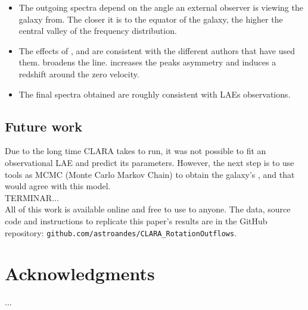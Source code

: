 \documentclass[twocolappendix]{latex/emulateapj}
\begin{document}
\begin{itemize}
	\item The outgoing spectra depend on the angle an external observer is viewing the galaxy from. The closer it is to the equator of the galaxy, the higher the central valley of the frequency distribution. \\
	
	\item The effects of \vrot, \vout and \tauh are consistent with the different authors that have used them. \vrot broadens the \lya line. \vout increases the peaks asymmetry and \tauh induces a redshift around the zero velocity.\\
	
	\item The final spectra obtained are roughly consistent with LAEs observations.  \\
	
\end{itemize}

\subsection{Future work}



Due to the long time CLARA takes to run, it was not possible to fit an observational LAE and predict its parameters. However, the next step is to use tools as MCMC (Monte Carlo Markov Chain) to obtain the galaxy's \tauh, \vrot and \vout that would agree with this model. \\

TERMINAR...\\

All of this work is available online and free to use to anyone. The data, source code and instructions to replicate this paper's results are in the GitHub repository:  \texttt{github.com/astroandes/CLARA\_RotationOutflows}. \\


\section*{Acknowledgments}

...\\


\end{document}
